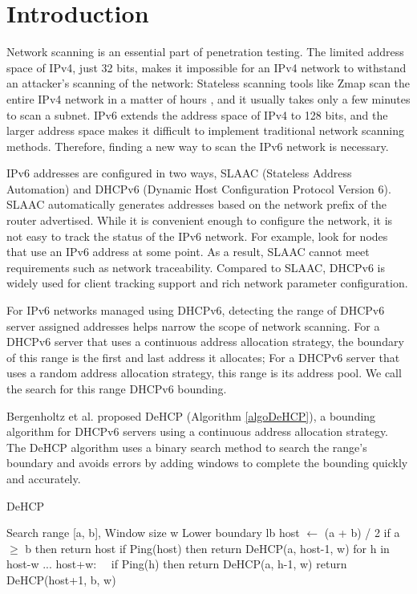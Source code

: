 \documentclass[conference]{IEEEtran}
\begin{document}
\section{Introduction}

Network scanning is an essential part of penetration testing. The
limited address space of IPv4, just 32 bits, makes it impossible for
an IPv4 network to withstand an attacker's scanning of the network:
Stateless scanning tools like Zmap scan the entire IPv4 network in a
matter of hours \cite{adrian_zippier_nodate}, and it usually takes
only a few minutes to scan a subnet. IPv6 extends the address space of
IPv4 to 128 bits, and the larger address space makes it difficult to
implement traditional network scanning methods. Therefore, finding a
new way to scan the IPv6 network is necessary.

IPv6 addresses are configured in two ways, SLAAC (Stateless Address
Automation) and DHCPv6 (Dynamic Host Configuration Protocol Version
6). SLAAC automatically generates addresses based on the network
prefix of the router advertised. While it is convenient enough to
configure the network, it is not easy to track the status of the IPv6
network. For example, look for nodes that use an IPv6 address at some
point. As a result, SLAAC cannot meet requirements such as network
traceability. Compared to SLAAC, DHCPv6 is widely used for client
tracking support and rich network parameter configuration.

For IPv6 networks managed using DHCPv6, detecting the range of DHCPv6
server assigned addresses helps narrow the scope of network
scanning. For a DHCPv6 server that uses a continuous address
allocation strategy, the boundary of this range is the first and last
address it allocates; For a DHCPv6 server that uses a random address
allocation strategy, this range is its address pool. We call the
search for this range DHCPv6 bounding.

Bergenholtz et al. \cite{bergenholtz_finding_2019} proposed DeHCP
(Algorithm \ref{algoDeHCP}), a bounding algorithm for DHCPv6 servers
using a continuous address allocation strategy. The DeHCP algorithm
uses a binary search method to search the range's boundary and avoids
errors by adding windows to complete the bounding quickly and
accurately.

\begin{algorithm}[H]
  \caption{DeHCP}
  \label{algoDeHCP}
  \renewcommand{\algorithmicrequire}{\textbf{Input:}}
  \renewcommand{\algorithmicensure}{\textbf{Output:}}
  \begin{algorithmic}[1]
    \REQUIRE Search range [a, b], Window size w
    \ENSURE Lower boundary lb
    \STATE host $\gets$ (a + b) / 2
    \STATE if a $\ge$ b then return host
    \STATE if Ping(host) then return DeHCP(a, host-1, w)
    \STATE for h in host-w ... host+w:
    \STATE \ \ if Ping(h) then return DeHCP(a, h-1, w)
    \STATE return DeHCP(host+1, b, w)
  \end{algorithmic}
\end{algorithm}
\end{document}
